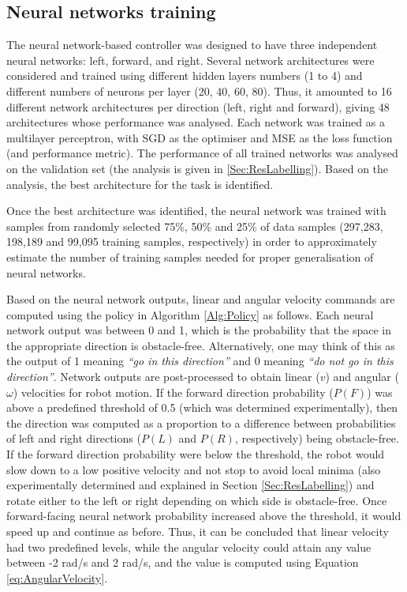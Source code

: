 \subsection{Neural networks training}

The neural network-based controller was designed to have three independent neural networks: left, forward, and right. Several network architectures were considered and trained using different hidden layers numbers (1 to 4) and different numbers of neurons per layer (20, 40, 60, 80). Thus, it amounted to 16 different network architectures per direction (left, right and forward), giving 48 architectures whose performance was analysed. Each network was trained as a multilayer perceptron, with SGD as the optimiser and MSE as the loss function (and performance metric). The performance of all trained networks was analysed on the validation set (the analysis is given in \cref{Sec:ResLabelling}). Based on the analysis, the best architecture for the task is identified.

Once the best architecture was identified, the neural network was trained with samples from randomly selected 75\%, 50\% and 25\% of data samples (297,283, 198,189 and 99,095 training samples, respectively) in order to approximately estimate the number of training samples needed for proper generalisation of neural networks. 

Based on the neural network outputs, linear and angular velocity commands are computed using the policy in Algorithm \ref{Alg:Policy} as follows. Each neural network output was between 0 and 1, which is the probability that the space in the appropriate direction is obstacle-free. Alternatively, one may think of this as the output of 1 meaning \emph{``go in this direction''} and 0 meaning \emph{``do not go in this direction''}. Network outputs are post-processed to obtain linear ($v$) and angular ($\omega$) velocities for robot motion. If the forward direction probability ($P(F)$) was above a predefined threshold of 0.5 (which was determined experimentally), then the direction was computed as a proportion to a difference between probabilities of left and right directions ($P(L)$ and $P(R)$, respectively) being obstacle-free. If the forward direction probability were below the threshold, the robot would slow down to a low positive velocity and not stop to avoid local minima (also experimentally determined and explained in Section \ref{Sec:ResLabelling}) and rotate either to the left or right depending on which side is obstacle-free. Once forward-facing neural network probability increased above the threshold, it would speed up and continue as before. Thus, it can be concluded that linear velocity had two predefined levels, while the angular velocity could attain any value between -2 rad/s and 2 rad/s, and the value is computed using Equation \ref{eq:AngularVelocity}.

